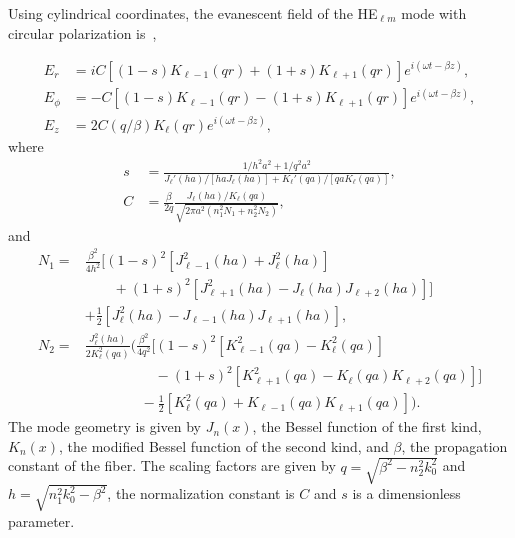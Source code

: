 Using cylindrical coordinates, the evanescent field of the HE$_{\ell m}$ mode with circular polarization is~\cite{minogin2010},

\begin{align}
        E_r &= iC[(1-s)K_{\ell-1}(qr) + (1+s)K_{\ell+1}(qr)]e^{i(\omega t- \beta z)}, \\
        E_\phi &= -C[(1-s)K_{\ell-1}(qr) - (1+s)K_{\ell+1}(qr)]e^{i(\omega t- \beta z)}, \\
        E_z &= 2C(q/\beta)K_\ell(qr)e^{i(\omega t - \beta z)},
\end{align}
where
\begin{align}
        s &= \frac{1/h^2a^2 + 1/q^2a^2}{J_\ell'(ha)/[haJ_\ell(ha)]+K_\ell'(qa)/[qaK_\ell(qa)]}, \\
        C &= \frac{\beta}{2q}\frac{J_\ell(ha)/K_\ell(qa)}{\sqrt{2\pi a^2(n_1^2N_1+n_2^2N_2)}},
\end{align}
and 
\begin{align}
N_1 =&\frac{\beta^2}{4h^2}\Big[(1-s)^2\left[J_{\ell-1}^2(ha)+J_\ell^2(ha)\right]\nonumber \\
   & \qquad+(1+s)^2\left[J_{\ell+1}^2(ha)-J_\ell(ha)J_{\ell+2}(ha)\right]\Big] \nonumber\\
   & +\frac12\left[J_\ell^2(ha) - J_{\ell-1}(ha)J_{\ell+1}(ha)\right], \\
N_2 =& \frac{J_\ell^2(ha)}{2K_\ell^2(qa)}\Bigg( \frac{\beta^2}{4q^2}\Big[(1-s)^2\left[K_{\ell-1}^2(qa)-K_\ell^2(qa)\right] \nonumber\\
   & \qquad\qquad\quad-(1+s)^2\left[K_{\ell+1}^2(qa)-K_\ell(qa)K_{\ell+2}(qa)\right]\Big] \nonumber\\
   & \qquad\qquad -\frac12\left[K_\ell^2(qa) + K_{\ell-1}(qa)K_{\ell+1}(qa)\right]\Bigg ).
\end{align}
The mode geometry is given by $J_n(x)$, the Bessel function of the first kind, $K_n(x)$, the modified Bessel function of the second kind, and $\beta$, the propagation constant of the fiber.
The scaling factors are given by $q = \sqrt{\beta^2-n_2^2k_0^2}$ and $h = \sqrt{n_1^2k_0^2 - \beta^2}$, the normalization constant is $C$ and $s$ is a dimensionless parameter.

